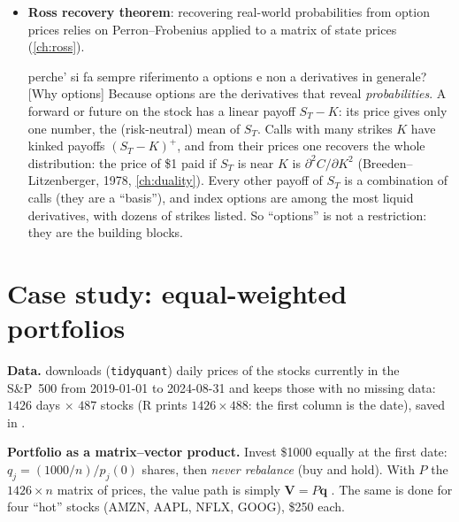 \begin{paracol}{2}
\begin{itemize}
\begin{answer}{significa che non c'e' nessuna posizione short? la first principal component e' quella che domina lon-time behaviour?}[No shorts]
No, here nothing evolves in time: $\Sigma$ is not applied repeatedly. The first component \emph{dominates the
variance}: it is the direction along which the returns spread the most. P--F gives the same
mathematical object in both cases (the top eigenvector), but in a Markov chain it is the long-run limit,
in PCA the largest-variance direction. (It \emph{would} dominate $\Sigma^t\bm x$ for large $t$, which is how
the power method computes it.)
\end{answer}
  \item \textbf{Ross recovery theorem}: recovering real-world probabilities from option prices relies on
        Perron--Frobenius applied to a matrix of state prices  (\cref{ch:ross}).\begin{answer}{perche' si fa sempre riferimento a options e non a derivatives in generale?}[Why options]
Because options are the derivatives that reveal \emph{probabilities}. A forward or future on the stock
has a linear payoff $S_T-K$: its price gives only one number, the (risk-neutral) mean of $S_T$. Calls with
many strikes $K$ have kinked payoffs $(S_T-K)^+$, and from their prices one recovers the whole
distribution: the price of \$1 paid if $S_T$ is near $K$ is $\partial^2C/\partial K^2$ (Breeden--Litzenberger, 1978,
\cref{ch:duality}). Every other payoff of $S_T$ is a combination of calls (they are a ``basis''), and index
options are among the most liquid derivatives, with dozens of strikes listed. So ``options'' is not a
restriction: they are the building blocks.
\end{answer}
\end{itemize}

\section{Case study: equal-weighted portfolios}\label{sec:ewport}

\begin{casestudy}
\textbf{Data.}  downloads (\texttt{tidyquant}) daily prices of the stocks
currently in the S\&P~500 from 2019-01-01 to 2024-08-31 and keeps those with no missing data:
$1426$ days $\times$ $487$ stocks (R prints $1426\times488$: the first column is the date), saved in .

\textbf{Portfolio as a matrix--vector product.} Invest \$1000 equally at the first date:
$q_j=(1000/n)/p_j(0)$ shares, then \emph{never rebalance} (buy and hold). With $P$ the
$1426\times n$ matrix of prices, the value path is simply $\bm V=P\bm q$ . The same is done for
four ``hot'' stocks (AMZN, AAPL, NFLX, GOOG), \$250 each.


\end{casestudy}
\end{paracol}

